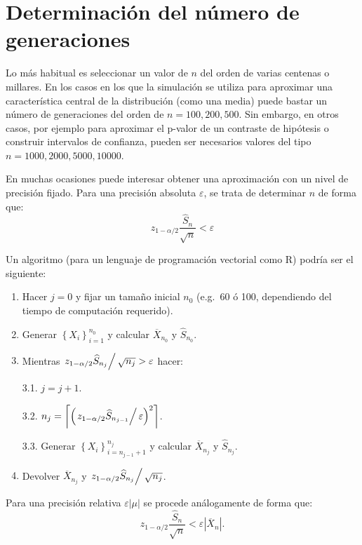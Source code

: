 \documentclass[
]{book}
\theoremstyle{break}
\theoremstyle{nonumberplain}
\begin{document}
\hypertarget{num-gen}{%
\section{Determinación del número de generaciones}\label{num-gen}}

Lo más habitual es seleccionar un valor de \(n\) del orden de varias centenas o millares.
En los casos en los que la simulación se utiliza para aproximar una característica central de la distribución (como una media) puede bastar un número de generaciones del orden de \(n = 100, 200, 500\).
Sin embargo, en otros casos, por ejemplo para aproximar el p-valor de un contraste de hipótesis o construir intervalos de confianza, pueden ser necesarios valores del tipo \(n = 1000, 2000, 5000, 10000\).

En muchas ocasiones puede interesar obtener una aproximación con un nivel de precisión fijado.
Para una precisión absoluta \(\varepsilon\), se trata de determinar
\(n\) de forma que:
\[z_{1-\alpha /2}\dfrac{\widehat{S}_{n}}{\sqrt{n}}<\varepsilon\]

Un algoritmo (para un lenguaje de programación vectorial como R) podría ser el siguiente:

\begin{enumerate}
\def\labelenumi{\arabic{enumi}.}
\item
  Hacer \(j=0\)
  y fijar un tamaño inicial \(n_{0}\) (e.g.~60 ó 100, dependiendo del tiempo de computación requerido).
\item
  Generar \(\left\{ X_{i}\right\} _{i=1}^{n_{0}}\)
  y calcular \(\overline{X}_{n_0}\) y \(\widehat{S}_{n_{0}}\).
\item
  Mientras \(\left. z_{1-\alpha /2}\widehat{S}_{n_j}\right/ \sqrt{n_{j}}>\varepsilon\) hacer:

  3.1. \(j=j+1\).

  3.2. \(n_{j}=\left\lceil \left( \left. z_{1-\alpha /2}\widehat{S}  _{n_{j-1}}\right/ \varepsilon \right)^{2}\right\rceil\).

  3.3. Generar \(\left\{ X_{i}\right\}_{i=n_{j-1}+1}^{n_j}\)
  y calcular \(\overline{X}_{n_j}\) y \(\widehat{S}_{n_j}\).
\item
  Devolver \(\overline{X}_{n_j}\) y \(\left. z_{1-\alpha /2}\widehat{S}_{n_j}\right/ \sqrt{n_{j}}\).
\end{enumerate}

Para una precisión relativa \(\varepsilon \left\vert \mu \right\vert\) se procede análogamente de forma que:
\[z_{1-\alpha /2}\dfrac{\widehat{S}_{n}}{\sqrt{n}}<\varepsilon \left\vert 
\overline{X}_{n}\right\vert .\]
\end{document}
